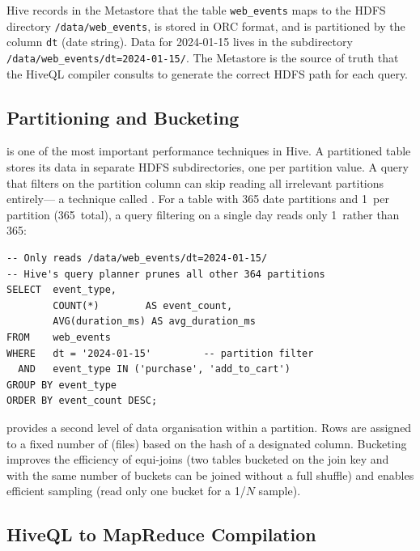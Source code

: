Hive records in the Metastore that the table \texttt{web\_events}
maps to the HDFS directory \texttt{/data/web\_events}, is stored
in ORC format, and is partitioned by the column \texttt{dt}
(date string). Data for 2024-01-15 lives in the subdirectory
\texttt{/data/web\_events/dt=2024-01-15/}. The Metastore is the
source of truth that the HiveQL compiler consults to generate the
correct HDFS path for each query.

\subsection{Partitioning and Bucketing}
\label{subsec:partitioning-bucketing}

 is one of the most important performance techniques
in Hive. A partitioned table stores its data in separate HDFS
subdirectories, one per partition value. A query that filters on the
partition column can skip reading all irrelevant partitions entirely---
a technique called . For a table with 365
date partitions and 1\TB\ per partition (365\TB\ total), a query
filtering on a single day reads only 1\TB\ rather than 365\TB:

\begin{lstlisting}[style=hiveql, caption={HiveQL: partition pruning in a query}]
-- Only reads /data/web_events/dt=2024-01-15/
-- Hive's query planner prunes all other 364 partitions
SELECT  event_type,
        COUNT(*)        AS event_count,
        AVG(duration_ms) AS avg_duration_ms
FROM    web_events
WHERE   dt = '2024-01-15'         -- partition filter
  AND   event_type IN ('purchase', 'add_to_cart')
GROUP BY event_type
ORDER BY event_count DESC;
\end{lstlisting}

 provides a second level of data organisation within
a partition. Rows are assigned to a fixed number of 
(files) based on the hash of a designated column. Bucketing improves
the efficiency of equi-joins (two tables bucketed on the join key and
with the same number of buckets can be joined without a full shuffle)
and enables efficient sampling (read only one bucket for a 1/$N$
sample).

\subsection{HiveQL to MapReduce Compilation}
\label{subsec:hiveql-compilation}

